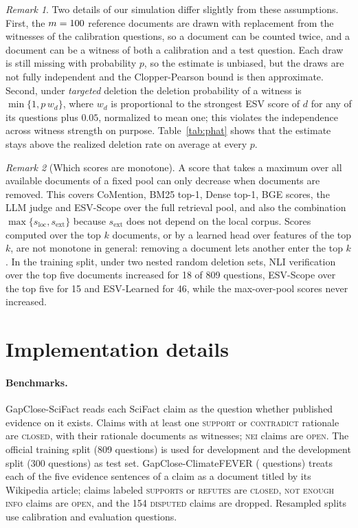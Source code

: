 \documentclass[10pt,a4paper]{article}
\theoremstyle{definition}
\theoremstyle{remark}
\newtheorem*{remark}{Remark}
\newcommand{\open}{\textup{\textsc{open}}}
\newcommand{\closed}{\textup{\textsc{closed}}}
\begin{document}
\begin{remark}
Two details of our simulation differ slightly from these assumptions. First, the $m=100{}$ reference documents are drawn with replacement from the witnesses of the calibration questions, so a document can be counted twice, and a document can be a witness of both a calibration and a test question. Each draw is still missing with probability $p$, so the estimate is unbiased, but the draws are not fully independent and the Clopper-Pearson bound is then approximate. Second, under \emph{targeted} deletion the deletion probability of a witness is $\min\{1,p\,w_d\}$, where $w_d$ is proportional to the strongest ESV score of $d$ for any of its questions plus $0.05$, normalized to mean one; this violates the independence across witness strength on purpose. Table~\ref{tab:phat} shows that the estimate stays above the realized deletion rate on average at every $p$.
\end{remark}

\begin{remark}[Which scores are monotone]
A score that takes a maximum over all available documents of a fixed pool can only decrease when documents are removed. This covers CoMention, BM25 top-1, Dense top-1, BGE scores, the LLM judge and ESV-Scope over the full retrieval pool, and also the combination $\max\{s_{\mathrm{loc}},s_{\mathrm{ext}}\}$ because $s_{\mathrm{ext}}$ does not depend on the local corpus. Scores computed over the top $k$ documents, or by a learned head over features of the top $k$, are not monotone in general: removing a document lets another enter the top $k$. In the training split, under two nested random deletion sets, NLI verification over the top five documents increased for 18 of 809 questions, ESV-Scope over the top five for 15 and ESV-Learned for 46, while the max-over-pool scores never increased.
\end{remark}

\section{Implementation details}\label{sec:impl}

\paragraph{Benchmarks.} GapClose-SciFact reads each SciFact claim as the question whether published evidence on it exists. Claims with at least one \textsc{support} or \textsc{contradict} rationale are \closed{}, with their rationale documents as witnesses; \textsc{nei} claims are \open{}. The official training split (809 questions) is used for development and the development split (300 questions) as test set. GapClose-ClimateFEVER (\SuppClimN{} questions) treats each of the five evidence sentences of a claim as a document titled by its Wikipedia article; claims labeled \textsc{supports} or \textsc{refutes} are \closed{}, \textsc{not enough info} claims are \open{}, and the 154 \textsc{disputed} claims are dropped. Resampled splits use \SuppClimCal{} calibration and \SuppClimEval{} evaluation questions.
\end{document}

